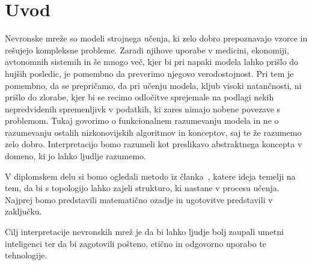 \chapter{Uvod}

Nevronske mreže so modeli strojnega učenja, ki zelo dobro prepoznavajo vzorce in rešujejo kompleksne probleme. Zaradi njihove uporabe v medicini, ekonomiji, avtonomnih sistemih in še mnogo več, kjer bi pri napaki modela lahko prišlo do hujših posledic, je pomembno da preverimo njegovo verodostojnost. Pri tem je pomembno, da se prepričamo, da pri učenju modela, kljub visoki natančnosti, ni prišlo do zlorabe, kjer bi se recimo odločitve sprejemale na podlagi nekih nepredvidenih spremenljivk v podatkih, ki zares nimajo nobene povezave s problemom. Tukaj govorimo o funkcionalnem razumevanju modela in ne o razumevanju ostalih nizkonovijskih algoritmov in konceptov, saj te že razumemo zelo dobro. Interpretacijo bomo razumeli kot preslikavo abstraktnega koncepta v domeno, ki jo lahko ljudlje razumemo.\cite{MONTAVON20181}

V diplomskem delu si bomo ogledali metodo iz članka~\cite{Gabella_2021}, katere ideja temelji na tem, da bi s topologijo lahko zajeli strukturo, ki nastane v procesu učenja. Najprej bomo predstavili matematično ozadje in ugotovitve predstavili v zaključku.

Cilj interpretacije nevronskih mrež je da bi lahko ljudje bolj zaupali umetni inteligenci ter da bi zagotovili pošteno, etično in odgovorno uporabo te tehnologije.

